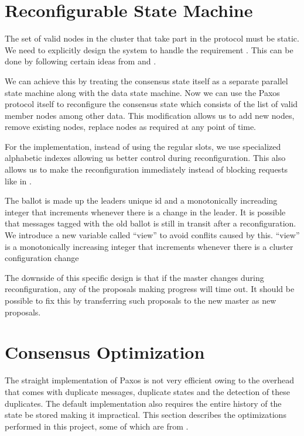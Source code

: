\section{Reconfigurable State Machine}
\label{section.a.n.d.reconfig}

The set of valid nodes in the cluster that take part in the protocol must
be static. We need to explicitly design the system to handle the requirement
. This can be done by following certain
ideas from \citet{LamportSP08} and \citet{LamportMZ10}.

We can achieve this by treating the consensus state itself as a separate
parallel state machine along with the data state machine. Now we can use
the Paxos protocol itself to reconfigure the consensus state which consists
of the list of valid member nodes among other data. This modification allows
us to add new nodes, remove existing nodes, replace nodes as required at any
point of time.

For the implementation, instead of using the regular slots, we use specialized
alphabetic indexes allowing us better control during reconfiguration. This also
allows us to make the reconfiguration immediately instead of blocking requests
like in \citet{LamportSP08}.

The ballot is made up the leaders unique id and a monotonically increading
integer that increments whenever there is a change in the leader. It is possible
that messages tagged with the old ballot is still in transit after a
reconfiguration. We introduce a new variable called ``view'' to avoid conflits
caused by this. ``view'' is a monotonically increasing integer that increments
whenever there is a cluster configuration change

The downside of this specific design is that if the master changes during
reconfiguration, any of the proposals making progress will time out. It
should be possible to fix this by transferring such proposals to the new master
as new proposals.

\section{Consensus Optimization}
\label{section:consensus.optimization}

The straight implementation of Paxos is not very efficient owing to the overhead
that comes with duplicate messages, duplicate states and the detection of these
duplicates. The default implementation also requires the entire history of the
state be stored making it impractical. This section describes the optimizations
performed in this project, some of which are from \citet{Robbert2011}.

